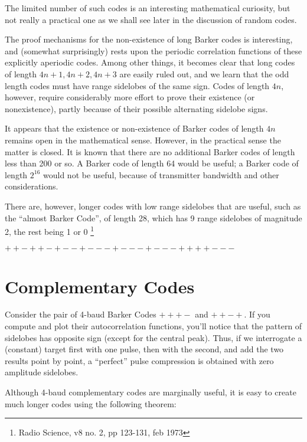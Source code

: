 The limited number of such codes is an interesting mathematical
curiosity, but not really a practical one as we shall see later in the
discussion of random codes.  

The proof mechanisms for the non-existence of long Barker codes is
interesting, and (somewhat surprisingly) rests upon the periodic
correlation functions of these explicitly aperiodic codes.   Among
other things, it becomes clear that long codes of length $4n+1,
4n+2,4n+3$ are easily ruled out, and we learn that the odd length
codes must have range sidelobes of the same sign.  Codes of length
$4n$, however, require considerably more effort to prove their
existence (or nonexistence), partly because of their possible
alternating sidelobe signs.

It appears that the existence or non-existence of Barker codes of
length $4n$ remains open in the mathematical sense.  However, in the
practical sense the matter is closed.  It is known that there are no
additional Barker codes of length less than 200 or so.  A Barker code
of length 64 would be useful; a Barker code of length $2^{16}$ would
not be useful, because of transmitter bandwidth and other
considerations.

There are, however, longer codes with low range sidelobes that are
useful, such as the ``almost Barker Code'', of length 28, which has 9
range sidelobes of magnitude 2, the rest being 1 or 0
\cite{gray+farley-1973} \footnote{Radio Science, v8 no. 2, pp 123-131,
  feb 1973}
\begin{center}
$++-++-+--+---+---+---++++---$
\end{center}


\section{Complementary Codes}

Consider the pair of 4-baud Barker Codes $+++-$ and $++-+$.  If you
compute and plot their autocorrelation functions, you'll notice that
the pattern of sidelobes has opposite sign (except for the central
peak).  Thus, if we interrogate a (constant) target first with one
pulse, then with the second, and add the two results point by point, a
``perfect'' pulse compression is obtained with zero amplitude
sidelobes.

Although 4-baud complementary codes are marginally useful, it is easy
to create much longer codes using the following theorem:

